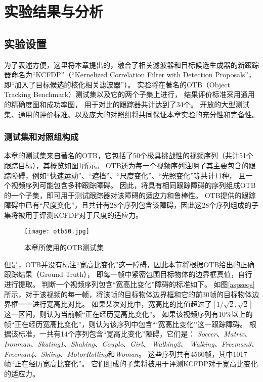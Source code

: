 \section{实验结果与分析}
\subsection{实验设置}
为了表述方便，这里将本章提出的，融合了相关滤波器和目标候选生成器的新跟踪器命名为``KCFDP''（``Kernelized Correlation Filter with Detection Proposals''，即``加入了目标候选的核化相关滤波器''）。
实验将在著名的OTB（Object Tracking Benchmark）测试集以及它的两个子集上进行，
结果评价标准采用通用的精确度图和成功率图，
用于对比的跟踪器共计达到了34个。
开放的大型测试集、通用的评价标准、以及庞大的对照组将共同保证本章实验的充分性和完备性。

\subsubsection{测试集和对照组构成}
本章的测试集来自著名的OTB，它包括了50个极具挑战性的视频序列（共计51个跟踪目标），其概览如图\ref{otb50}所示。
OTB还为每一个视频序列注明了其主要包含的跟踪障碍，例如``快速运动''、``遮挡''、``尺度变化''、``光照变化''等共计11种，
且一个视频序列可能包含多种跟踪障碍。
因此，将具有相同跟踪障碍的序列组成OTB的一个子集，即可用于测试跟踪器对该障碍的适应力和鲁棒性。
OTB提供的跟踪障碍中已有``尺度变化''，且共计有28个序列包含该障碍，因此这28个序列组成的子集将被用于评测KCFDP对于尺度的适应力。

\begin{figure}[htb]
	\centering
		\texttt{[image: otb50.jpg]}
	\caption{本章所使用的OTB测试集}
	\label{otb50}
\end{figure}

但是，OTB并没有标注``宽高比变化''这一障碍，因此本节将根据OTB给出的正确跟踪结果（Ground Truth），
即每一帧中紧密包围目标物体的边界框真值，自行进行提取。
判断一个视频序列包含``宽高比变化''障碍的标准如下。
如图\ref{aspseqs}所示，对于该视频的每一帧，将该帧的目标物体边界框和它的前30帧的目标物体边界框一一进行宽高比对比。
如果某次对比中，宽高比的比值超过了$[1/\sqrt{2}, \sqrt{2} ]$这一区间，则认为当前帧``正在经历宽高比变化''。
如果该视频序列有10\%以上的帧``正在经历宽高比变化''，则认为该序列中包含```宽高比变化''这一跟踪障碍。
根据该标准，一共有14个序列包含``宽高比变化''障碍，它们是：
\textit{Soccer}、\textit{Matrix}、\textit{Ironman}、\textit{Skating1}、\textit{Shaking}、\textit{Couple}、\textit{Girl}、
\textit{Walking2}、 \textit{Walking}、\textit{Freeman3}、\textit{Freeman4}、\textit{Skiing}、\textit{MotorRolling}和\textit{Woman}。
这些序列共有4560帧，其中1017帧``正在经历宽高比变化''。
它们组成的子集将被用于评测KCFDP对于宽高比变化的适应力。

